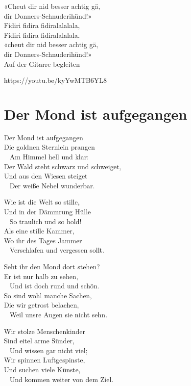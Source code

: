 \documentclass[
  letterpaper,
]{scrbook}
\begin{document}
«Cheut dir nid besser achtig gä,\\
dir Donners-Schnuderihünd!»\\
Fidiri fidira fidiralalalala,\\
Fidiri fidira fidiralalalala.\\
«cheut dir nid besser achtig gä,\\
dir Donners-Schnuderihünd!»\\
Auf der Gitarre begleiten

https://youtu.be/kyYwMTB6YL8

\hypertarget{der-mond-ist-aufgegangen}{%
\chapter{Der Mond ist aufgegangen}\label{der-mond-ist-aufgegangen}}

Der Mond ist aufgegangen\\
Die goldnen Sternlein prangen\\
\hspace*{0.333em} ~ Am Himmel hell und klar:\\
Der Wald steht schwarz und schweiget,\\
Und aus den Wiesen steiget\\
\hspace*{0.333em} ~ Der weiße Nebel wunderbar.

Wie ist die Welt so stille,\\
Und in der Dämmrung Hülle\\
\hspace*{0.333em} ~ So traulich und so hold!\\
Als eine stille Kammer,\\
Wo ihr des Tages Jammer\\
\hspace*{0.333em} ~ Verschlafen und vergessen sollt.

Seht ihr den Mond dort stehen?\\
Er ist nur halb zu sehen,\\
\hspace*{0.333em} ~ Und ist doch rund und schön.\\
So sind wohl manche Sachen,\\
Die wir getrost belachen,\\
\hspace*{0.333em} ~ Weil unsre Augen sie nicht sehn.

Wir stolze Menschenkinder\\
Sind eitel arme Sünder,\\
\hspace*{0.333em} ~ Und wissen gar nicht viel;\\
Wir spinnen Luftgespinste,\\
Und suchen viele Künste,\\
\hspace*{0.333em} ~ Und kommen weiter von dem Ziel.
\end{document}
